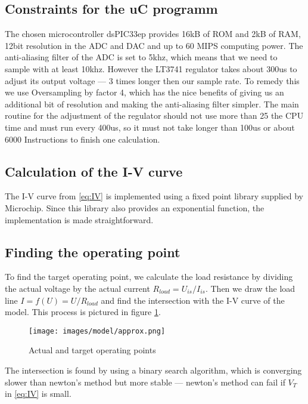 

\subsection{Constraints for the uC programm}

The chosen microcontroller dsPIC33ep provides 16kB  of ROM and 2kB of RAM, 12bit
resolution  in  the  ADC  and  DAC  and  up  to  60  MIPS  computing  power. The
anti-aliasing filter of the ADC is set to 5khz, which  means  that  we  need  to
sample with at least 10khz. However the LT3741 regulator  takes  about  300us to
adjust  its  output  voltage  --- 3 times longer then our sample rate. To remedy
this  we use Oversampling by factor 4, which has the nice benefits of giving  us
an additional bit of resolution and making the anti-aliasing filter simpler. The
main routine for the adjustment of the regulator should not use more than 25%
the CPU  time and must run every 400us, so it must not take longer than 100us or
about 6000 Instructions to finish one calculation.


\subsection{Calculation of the I-V curve}

The  I-V  curve  from  \eqref{eq:IV} is implemented using a fixed point  library
supplied by Microchip. Since this library also provides an exponential function,
the implementation is made straightforward.


\subsection{Finding the operating point}
\label{subsec:finding-the-operating-point}

To find the target operating point, we calculate the load resistance by dividing
the actual voltage by the actual current $R_{load} = U_{is}  /  I_{is}$. Then we
draw the load line $I = f(U) =  U / R_{load}$ and find the intersection with the
I-V   curve   of   the   model.   This   process   is   pictured    in    figure
\ref{fig:model:approx}.
\begin{figure}[h]
	\center
    \texttt{[image: images/model/approx.png]}
    \caption{Actual and target operating points}
    \label{fig:model:approx}
\end{figure}
The  intersection  is found  by  using  a  binary  search  algorithm,  which  is
converging slower than newton's method but more  stable  --- newton's method can
fail if $V_T$ in \eqref{eq:IV} is small.


